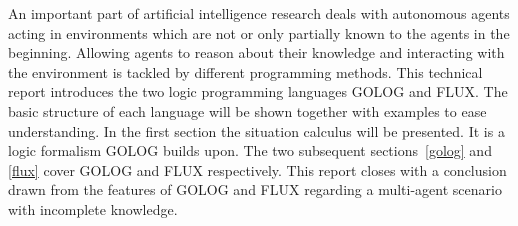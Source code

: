 An important part of artificial intelligence research deals with autonomous agents acting in environments which are not or only partially known to the agents in the beginning. Allowing agents to reason about their knowledge and interacting with the environment is tackled by different programming methods. This technical report introduces the two logic programming languages GOLOG and FLUX. The basic structure of each language will be shown together with examples to ease understanding. In the first section the situation calculus will be presented. It is a logic formalism GOLOG builds upon. The two subsequent sections~\ref{golog} and \ref{flux} cover GOLOG and FLUX respectively. This report closes with a conclusion drawn from the features of GOLOG and FLUX regarding a multi-agent scenario with incomplete knowledge.
